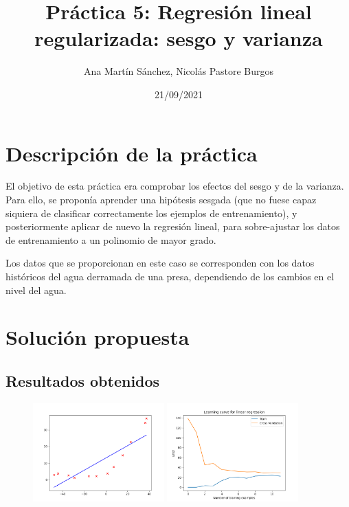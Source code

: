 \documentclass[11pt]{article}
\title{Práctica 5: Regresión lineal regularizada: sesgo y varianza}
\author{Ana Martín Sánchez, Nicolás Pastore Burgos}
\date{21/09/2021}
\begin{document}
\maketitle

\section{Descripción de la práctica}

  El objetivo de esta práctica era comprobar los efectos del sesgo y de la varianza. Para ello, se proponía aprender una hipótesis sesgada (que no fuese capaz siquiera de clasificar correctamente los ejemplos de entrenamiento), y posteriormente aplicar de nuevo la regresión lineal, para sobre-ajustar los datos de entrenamiento a un polinomio de mayor grado.

Los datos que se proporcionan en este caso se corresponden con los datos históricos del agua derramada de una presa, dependiendo de los cambios en el nivel del agua.

\section{Solución propuesta}

\subsection{Resultados obtenidos}

 \begin{figure}[h!]
    \begin{center}
    \includegraphics[width=0.45\textwidth]{Figura1.png}
    \includegraphics[width=0.45\textwidth]{Figura2.png}
    \end{center}
 \end{figure}
\end{document}

